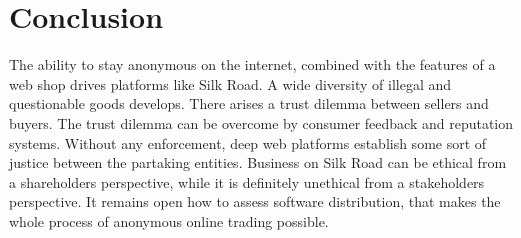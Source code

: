 \section{Conclusion}

The ability to stay anonymous on the internet, combined with the features of a web shop drives platforms like Silk Road. A wide diversity of illegal and questionable goods develops. There arises a trust dilemma between sellers and buyers. The trust dilemma can be overcome by consumer feedback and reputation systems. Without any enforcement, deep web platforms establish some sort of justice between the partaking entities. Business on Silk Road can be ethical from a shareholders perspective, while it is definitely unethical from a stakeholders perspective. It remains open how to assess software distribution, that makes the whole process of anonymous online trading possible. 